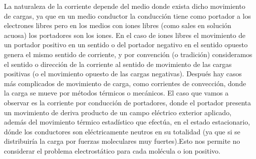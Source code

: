 \documentclass[11pt,a4paper]{article}
\numberwithin{equation}{section}
\begin{document}
La naturaleza de la corriente depende del medio donde exista dicho movimiento de cargas, ya que en un medio conductor la conducción tiene como portador a los electrones libres pero en los medios con iones libres (como sales en solución acuosa) los portadores son los iones. En el caso de iones libres el movimiento de un portador positivo en un sentido o del portador negativo en el sentido opuesto genera el mismo sentido de corriente, y por convención (o tradición) consideramos el sentido o dirección de la corriente al sentido de movimiento de las cargas positivas (o el movimiento opuesto de las cargas negativas). Después hay casos más complicados de movimiento de carga, como corrientes de convección, donde la carga se mueve por métodos térmicos o mecánicos. El caso que vamos a observar es la corriente por conducción de portadores, donde el portador presenta un movimiento de deriva producto de un campo eléctrico exterior aplicado, además del movimiento térmico estadístico que efectúa, en el estado estacionario, dónde los conductores son eléctricamente neutros en su totalidad (ya que si se distribuiría la carga por fuerzas moleculares muy fuertes).Esto nos permite no considerar el problema electrostático para cada molécula o ion positivo.
\end{document}
